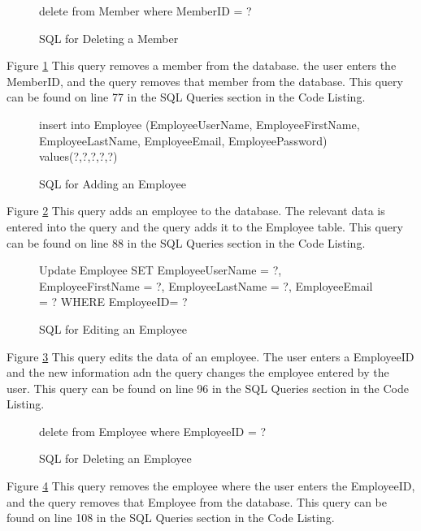 \begin{figure}[H]
	 \caption{SQL for Deleting a Member} \label{fig:delete-member-sql}
\begin{sql}
delete from Member where MemberID = ?
\end{sql}
\end{figure}
Figure \ref{fig:delete-member-sql} This query removes a member from the database. the user enters the MemberID, and the query removes that member from the database. This query can be found on line 77 in the SQL Queries section in the Code Listing.


\begin{figure}[H]
	 \caption{SQL for Adding an Employee} \label{fig:add-employee-sql}
\begin{sql}
insert into Employee (EmployeeUserName, EmployeeFirstName, EmployeeLastName, EmployeeEmail, EmployeePassword) values(?,?,?,?,?) 
\end{sql}
\end{figure}
Figure \ref{fig:add-employee-sql} This query adds an employee to the database. The relevant data is entered into the query and the query adds it to the Employee table. This query can be found on line 88 in the SQL Queries section in the Code Listing.

\begin{figure}[H]
	 \caption{SQL for Editing an Employee} \label{fig:edit-employee-sql}
\begin{sql}
Update Employee SET EmployeeUserName = ?,
                                     EmployeeFirstName = ?,
                                     EmployeeLastName = ?,
                                     EmployeeEmail = ?
                                     WHERE EmployeeID= ?
                                     \end{sql}
\end{figure}
Figure \ref{fig:edit-employee-sql} This query edits the data of an employee. The user enters a EmployeeID and the new information adn the query changes the employee entered by the user. This query can be found on line 96 in the SQL Queries section in the Code Listing.

\begin{figure}[H]
	 \caption{SQL for Deleting an Employee} \label{fig:delete-employee-sql}
\begin{sql}
 delete from Employee where EmployeeID = ?
  \end{sql}
\end{figure}

Figure \ref{fig:delete-employee-sql} This query removes the employee where the user enters the EmployeeID, and the query removes that Employee from the database. This query can be found on line 108 in the SQL Queries section in the Code Listing.

